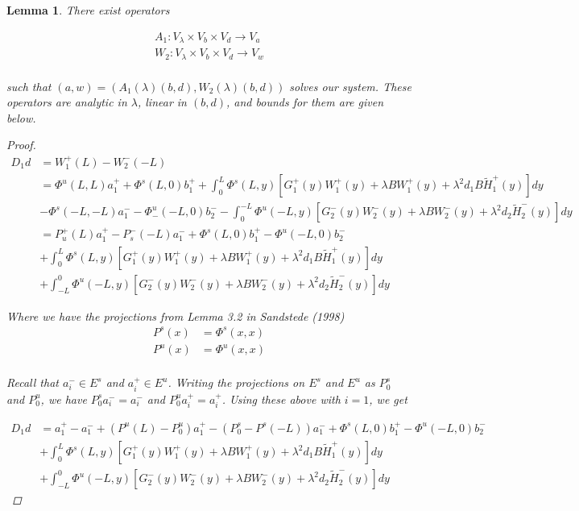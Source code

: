 \documentclass[12pt]{article}
\newtheorem{lemma}{Lemma}
\begin{document}
\begin{lemma}
There exist operators

\begin{align*}
A_1: V_\lambda \times V_b \times V_d \rightarrow V_a \\
W_2: V_\lambda \times V_b \times V_d \rightarrow V_w \\
\end{align*}

such that $(a,w) = ( A_1(\lambda)(b,d), W_2(\lambda)(b,d) )$ solves our system. These operators are analytic in $\lambda$, linear in $(b,d)$, and bounds for them are given below.

\begin{proof}
\begin{align*}
D_1 d &= W_1^+(L) - W_2^-(-L) \\
&= \Phi^u(L, L)a^+_{1} + \Phi^s(L, 0)b_1^+ 
+ \int_0^L \Phi^s(L, y)[G_1^+(y) W_1^+(y) + \lambda B W_1^+(y) + \lambda^2 d_1 B \tilde{H}_1^+(y) ] dy \\  
&- \Phi^s(-L, -L)a^-_{1} - \Phi^u_-(-L, 0)b_2^- - \int_0^{-L} \Phi^u(-L, y)[G_2^-(y) W_2^-(y) + \lambda B W_2^-(y) + \lambda^2 d_2 \tilde{H}_2^-(y) ] dy \\
&= P_u^+(L) a^+_{1} - P_s^-(-L) a^-_{1} + \Phi^s(L, 0)b_1^+ - \Phi^u(-L, 0)b_2^- \\
&+ \int_0^L \Phi^s(L, y)[G_1^+(y) W_1^+(y) + \lambda B W_1^+(y) + \lambda^2 d_1 B \tilde{H}_1^+(y) ] dy \\
&+ \int_{-L}^0 \Phi^u(-L, y)[G_2^-(y) W_2^-(y) + \lambda B W_2^-(y) + \lambda^2 d_2 \tilde{H}_2^-(y) ] dy 
\end{align*}

Where we have the projections from Lemma 3.2 in Sandstede (1998)
\begin{align*}
P^s(x) &= \Phi^s(x,x) \\
P^u(x) &= \Phi^u(x,x) \\
\end{align*}

Recall that $a_i^- \in E^s$ and $a_i^+ \in E^u$. Writing the projections on $E^s$ and $E^u$ as $P_0^s$ and $P_0^u$, we have $P_0^s a_i^- = a_i^-$ and $P_0^u a_i^+ = a_i^+$. Using these above with $i = 1$, we get 

\begin{align*}
D_1 d &=  a^+_1 - a^-_1 + (P^u(L) - P_0^u) a^+_1 - (P_0^s - P^s(-L)) a^-_1 + \Phi^s(L, 0)b_1^+ - \Phi^u(-L, 0)b_2^- \\
&+ \int_0^L \Phi^s(L, y)[G_1^+(y) W_1^+(y) + \lambda B W_1^+(y) + \lambda^2 d_1 B \tilde{H}_1^+(y) ] dy \\
&+ \int_{-L}^0 \Phi^u(-L, y)[G_2^-(y) W_2^-(y) + \lambda B W_2^-(y) + \lambda^2 d_2 \tilde{H}_2^-(y) ] dy 
\end{align*}


\end{proof}
\end{lemma}
\end{document}
